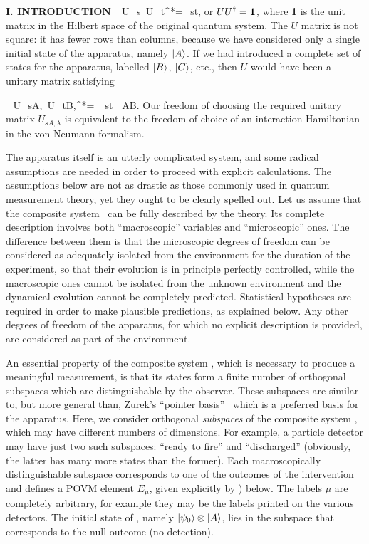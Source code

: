 \begin{center}{\bf I. INTRODUCTION}
\beq \sum_\lambda U_{s\lambda}\, U_{t\lambda}^*=\delta_{st},
 \label{unitU}\eeq
or $UU^\dagger={\bf1}$, where {\bf1} is the unit matrix in the Hilbert
space of the original quantum system. The $U$ matrix is not square: it
has fewer rows than columns, because we have considered only a single
initial state of the apparatus, namely $|A\rangle$. If we had introduced a
complete set of states for the apparatus, labelled $|B\rangle$, $|C\rangle$, etc.,
then $U$ would have been a unitary matrix satisfying

\beq \sum_\lambda U_{sA,\lambda}\, U_{tB,\lambda}^*=
 \delta_{st}\,\delta_{AB}.\eeq
Our freedom of choosing the required unitary matrix $U_{sA,\lambda}$ is
equivalent to the freedom of choice of an interaction Hamiltonian in the
von Neumann formalism.

The apparatus itself is an utterly complicated system, and some radical
assumptions are needed in order to proceed with explicit calculations.
The assumptions below are not as drastic as those commonly used in
quantum measurement theory, yet they ought to be clearly spelled out.
Let us assume that the composite system \cC\ can be fully described by
the theory. Its complete description involves both ``macroscopic''
variables and ``microscopic'' ones. The difference between them is that
the microscopic degrees of freedom can be considered as adequately
isolated from the environment for the duration of the experiment, so
that their evolution is in principle perfectly controlled, while the
macroscopic ones cannot be isolated from the unknown environment and
the dynamical evolution cannot be completely predicted. Statistical
hypotheses are required in order to make plausible predictions, as
explained below. Any other degrees of freedom of the apparatus, for
which no explicit description is provided, are considered as part of the
environment.

An essential property of the composite system \cC, which is necessary to
produce a meaningful measurement, is that its states form a finite
number of orthogonal subspaces which are distinguishable by the
observer. These subspaces are similar to, but more general than, Zurek's
``pointer basis''~\cite{pointer} which is a preferred basis for the
apparatus. Here, we consider ortho\-gonal {\it subspaces\/} of the
composite system \cC, which may have different numbers of dimensions.
For example, a particle detector may have just two such subspaces:
``ready to fire'' and ``discharged'' (obviously, the latter has many
more states than the former). Each macroscopically distinguishable
subspace corresponds to one of the outcomes of the intervention and
defines a POVM element $E_\mu$, given explicitly by ) below.
The labels $\mu$ are completely arbitrary, for example they may be the
labels printed on the various detectors. The initial state of \cC,
namely $|\psi_0\rangle\otimes|A\rangle$, lies in the subspace that corresponds to the
null outcome (no detection).


\end{center}
